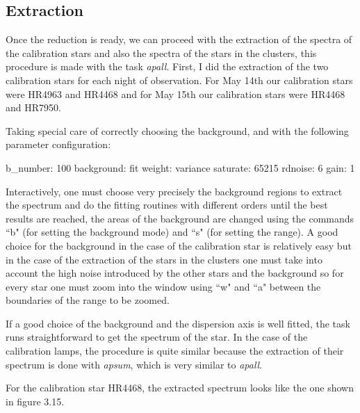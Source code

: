 \subsection{Extraction}

Once the reduction is ready, we can proceed with the extraction of the spectra of the calibration stars and also the spectra of the stars in the clusters, this procedure is made with the task \textit{apall}. First, I did the extraction of the two calibration stars for each night of observation. For May 14th our calibration stars were HR4963 and HR4468 and for May 15th our calibration stars were HR4468 and HR7950.

Taking special care of correctly choosing the background, and with the following parameter configuration:

b\_number: 100
background: fit
weight: variance
saturate: 65215
rdnoise: 6
gain: 1

Interactively, one must choose very precisely the background regions to extract the spectrum and do the fitting routines with different orders until the best results are reached, the areas of the background are changed using the commands ``b" (for setting the background mode) and ``s" (for setting the range). A good choice for the background in the case of the calibration star is relatively easy but in the case of the extraction of the stars in the clusters one must take into account the high noise introduced by the other stars and the background so for every star one must zoom into the window using ``w" and ``a" between the boundaries of the range to be zoomed.

If a good choice of the background and the dispersion axis is well fitted, the task runs straightforward to get the spectrum of the star. In the case of the calibration lamps, the procedure is quite similar because the extraction of their spectrum is done with \textit{apsum}, which is very similar to \textit{apall}. 

For the calibration star HR4468, the extracted spectrum looks like the one shown in figure 3.15.

